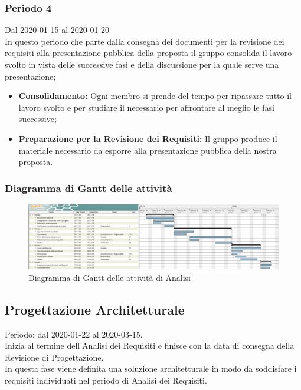 \subsubsection{Periodo 4} 
Dal 2020-01-15 al 2020-01-20\\
In questo periodo che parte dalla consegna dei documenti per la revisione dei requisiti alla presentazione pubblica della proposta il gruppo consolida il lavoro svolto in vista delle successive fasi e della discussione per la quale serve una presentazione;
\begin{itemize}
	\item \textbf{Consolidamento:} Ogni membro si prende del tempo per ripassare tutto il lavoro svolto e per studiare il necessario per affrontare al meglio le fasi successive;
	\item \textbf{Preparazione per la Revisione dei Requisiti:} Il gruppo produce il materiale necessario da esporre alla presentazione pubblica della nostra proposta.
\end{itemize}

	\newpage
	\begin{landscape}
	\subsubsection{Diagramma di Gantt delle attività}
	\pagestyle{empty}
	\begin{figure}[h]
		\caption{Diagramma di Gantt delle attività di Analisi}
		\begin{center}	
			\includegraphics[scale=0.50]{Sezioni/DiagrammiGantt/Analisi.png}
		\end{center}
		
	\end{figure}
	 \end{landscape}

\clearpage
\subsection{Progettazione Architetturale}
Periodo: dal 2020-01-22 al 2020-03-15.
\\Inizia al termine dell'Analisi dei Requisiti e finisce con la data di consegna della Revisione di Progettazione.
\\In questa fase viene definita una soluzione architetturale in modo da soddisfare i requisiti individuati nel periodo di Analisi dei Requisiti.

